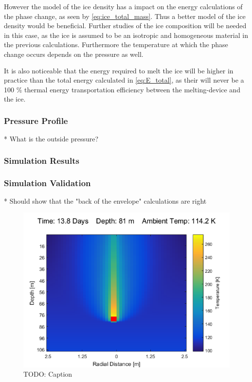 However the model of the ice density has a impact on the energy calculations of the phase change, as seen by \eqref{eq:ice_total_mass}. Thus a better model of the ice density would be beneficial. Further studies of the ice composition will be needed in this case, as the ice is assumed to be an isotropic and homogeneous material in the previous calculations. Furthermore the temperature at which the phase change occurs depends on the pressure as well.

It is also noticeable that the energy required to melt the ice will be higher in practice than the total energy calculated in \eqref{eq:E_total}, as their will never be a 100 \% thermal energy transportation efficiency between the melting-device and the ice.

\subsubsection{Pressure Profile}

* What is the outside pressure?

\subsubsection{Simulation Results}\label{sec:temp_simulation}

\subsubsection{Simulation Validation}

* Should show that the "back of the envelope" calculations are right

\begin{figure}[htb]
	\centering
	\includegraphics[width=\textwidth]{figures/temperature/temperature_simulation}
	\caption{TODO: Caption}
	\label{fig:temperature_simulation}
\end{figure}

